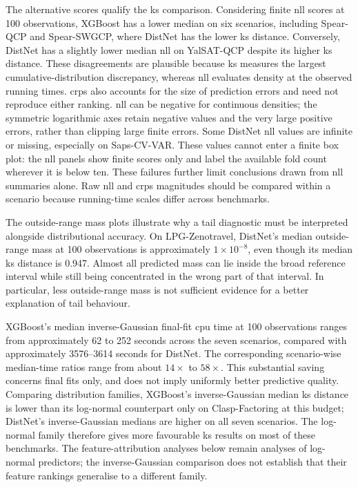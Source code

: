 The alternative scores qualify the \gls{ks} comparison. Considering finite \gls{nll} scores at 100 observations, XGBoost has a lower median on six scenarios, including Spear-QCP and Spear-SWGCP, where DistNet has the lower \gls{ks} distance. Conversely, DistNet has a slightly lower median \gls{nll} on YalSAT-QCP despite its higher \gls{ks} distance. These disagreements are plausible because \gls{ks} measures the largest cumulative-distribution discrepancy, whereas \gls{nll} evaluates density at the observed running times. \gls{crps} also accounts for the size of prediction errors and need not reproduce either ranking. \gls{nll} can be negative for continuous densities; the symmetric logarithmic axes retain negative values and the very large positive errors, rather than clipping large finite errors. Some DistNet \gls{nll} values are infinite or missing, especially on Saps-CV-VAR. These values cannot enter a finite box plot: the \gls{nll} panels show finite scores only and label the available fold count wherever it is below ten. These failures further limit conclusions drawn from \gls{nll} summaries alone. Raw \gls{nll} and \gls{crps} magnitudes should be compared within a scenario because running-time scales differ across benchmarks.

The outside-range mass plots illustrate why a tail diagnostic must be interpreted alongside distributional accuracy. On LPG-Zenotravel, DistNet's median outside-range mass at 100 observations is approximately $1\times10^{-8}$, even though its median \gls{ks} distance is 0.947. Almost all predicted mass can lie inside the broad reference interval while still being concentrated in the wrong part of that interval. In particular, less outside-range mass is not sufficient evidence for a better explanation of tail behaviour.

XGBoost's median inverse-Gaussian final-fit \gls{cpu} time at 100 observations ranges from approximately 62 to 252 seconds across the seven scenarios, compared with approximately 3576--3614 seconds for DistNet. The corresponding scenario-wise median-time ratios range from about $14\times$ to $58\times$. This substantial saving concerns final fits only, and does not imply uniformly better predictive quality. Comparing distribution families, XGBoost's inverse-Gaussian median \gls{ks} distance is lower than its log-normal counterpart only on Clasp-Factoring at this budget; DistNet's inverse-Gaussian medians are higher on all seven scenarios. The log-normal family therefore gives more favourable \gls{ks} results on most of these benchmarks. The feature-attribution analyses below remain analyses of log-normal predictors; the inverse-Gaussian comparison does not establish that their feature rankings generalise to a different family.

